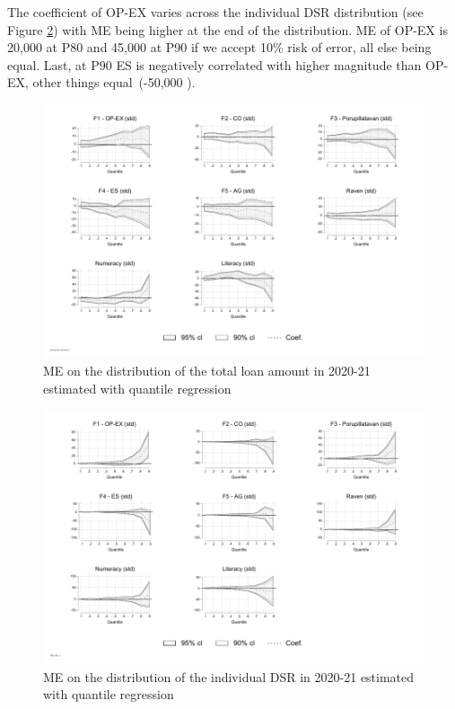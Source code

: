 \documentclass[a4paper, 11pt, onecolumn]{article}
\newcommand{\aebe}{all else being equal}
\newcommand{\ote}{other things equal}
\begin{document}
The coefficient of OP-EX varies across the individual DSR distribution (see Figure \ref{fig:qreg_dsr}) with ME being higher at the end of the distribution.
ME of OP-EX is 20,000 \rupee at P80 and 45,000 at P90 if we accept 10\% risk of error, \aebe.
Last, at P90 ES is negatively correlated with higher magnitude than OP-EX, \ote~(-50,000 \rupee).



\begin{figure}[!ht]
\raggedright
\includegraphics[width=\textwidth]{INPUT/qreg_loanamount_indiv1000_2}
\caption{ME on the distribution of the total loan amount in 2020-21 estimated with quantile regression}
\label{fig:qreg_loanamount}
\end{figure}

\begin{figure}[!ht]
\raggedright
\includegraphics[width=\textwidth]{INPUT/qreg_DSR_indiv_2}
\caption{ME on the distribution of the individual DSR in 2020-21 estimated with quantile regression}
\label{fig:qreg_dsr}
\end{figure}
\end{document}
